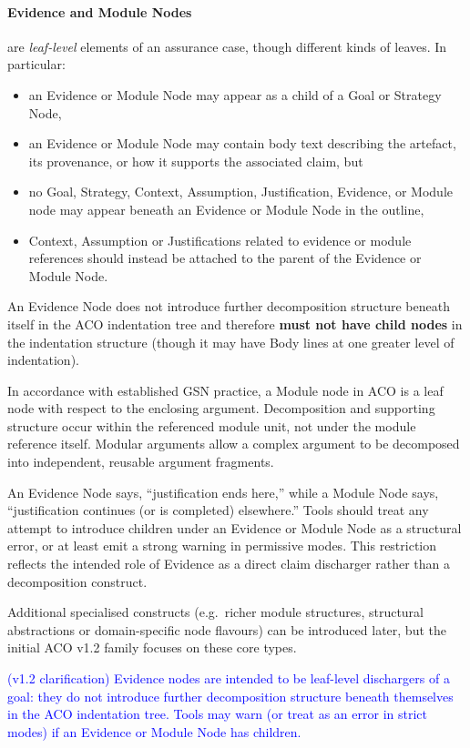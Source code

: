 \documentclass[11pt]{article}
\begin{document}
\paragraph{Evidence and Module Nodes} are \emph{leaf-level} elements of an assurance case, though different kinds of leaves.
In particular:
\begin{itemize}[leftmargin=2em]
  \item an Evidence or Module Node may appear as a child of a Goal or Strategy Node,
  \item an Evidence or Module Node may contain body text describing the artefact, its provenance,
        or how it supports the associated claim, but
  \item no Goal, Strategy, Context, Assumption, Justification, Evidence, or Module node
        may appear beneath an Evidence or Module Node in the outline,
  \item Context, Assumption or Justifications related to evidence or module references should instead be attached to the parent of the Evidence or Module Node.
\end{itemize}

An Evidence Node
does not introduce further decomposition structure beneath itself in the ACO indentation tree and therefore
\textbf{must not have child nodes} in the indentation structure (though it may have Body lines at one greater level of indentation).

In accordance with established GSN practice, a Module node in ACO is a leaf node with respect to the enclosing argument. Decomposition and supporting structure occur within the referenced module unit, not under the module reference itself.
Modular arguments allow a complex argument to be decomposed into independent, reusable argument fragments.

An Evidence Node says, ``justification ends here,'' while a Module Node says, ``justification continues (or is completed) elsewhere.''
Tools should treat any attempt to introduce children under an Evidence or Module Node as a
structural error, or at least emit a strong warning in permissive modes.
This restriction reflects the intended role of Evidence as a direct claim discharger
rather than a decomposition construct.

Additional specialised constructs (e.g.\ richer module structures, structural abstractions or domain-specific node flavours) can be introduced later, but the initial ACO v1.2 family focuses on these core types.

\textcolor{blue}{(v1.2 clarification) Evidence nodes are intended to be leaf-level dischargers of a goal: they do not introduce further decomposition structure beneath themselves in the ACO indentation tree. Tools may warn (or treat as an error in strict modes) if an Evidence or Module Node has children.}
\end{document}
